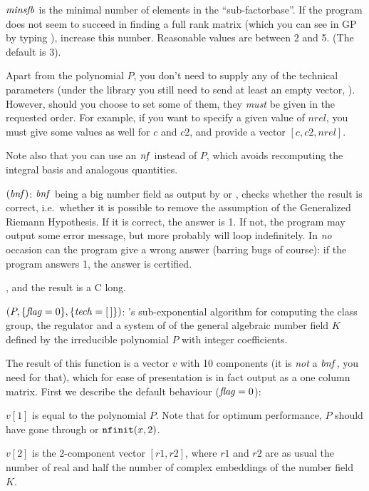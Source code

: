 $\hbox{\it minsfb\/}$ is the minimal number of elements in the ``sub-factorbase''.
If the program does not seem to succeed in finding a full rank matrix (which
you can see in GP by typing ), increase this number. Reasonable
values are between 2 and 5. (The default is 3).


Apart from the polynomial $P$, you don't need to supply any of the technical
parameters (under the library you still need to send at least an empty
vector, ). However, should you choose to set some of
them, they \emph{must} be given in the requested order. For example, if you
want to specify a given value of $nrel$, you must give some values as well
for $c$ and $c2$, and provide a vector $[c,c2,nrel]$.

Note also that you can use an $\hbox{\it nf\/}$ instead of $P$, which avoids
recomputing the integral basis and analogous quantities.

\smallskip
{}$(\hbox{\it bnf\/})$: $\hbox{\it bnf\/}$ being a big number field
as output by  or , checks whether the result
is correct, i.e.~whether it is possible to remove the assumption of the
Generalized Riemann Hypothesis. If it is correct, the answer is 1.
If not, the program may output some error message, but more probably will loop
indefinitely. In \emph{no} occasion can the program give a wrong answer
(barring bugs of course): if the program answers 1, the answer is certified.

, and the result is a C long.

$(P,\{\hbox{\it f\kern0pt lag\/}=0\},\{\hbox{\it tech\/}=[\,]\})$: 's
sub-exponential algorithm for computing the class group, the regulator and a
system of  of the general algebraic number field $K$
defined by the irreducible polynomial $P$ with integer coefficients.

The result of this function is a vector $v$ with 10 components (it is
\emph{not} a $\hbox{\it bnf\/}$, you need  for that), which for ease of
presentation is in fact output as a one column matrix. First we describe the
default behaviour ($\hbox{\it f\kern0pt lag\/}=0$):

 $v[1]$ is equal to the polynomial $P$. Note that for optimum performance,
$P$ should have gone through  or ${\tt nfinit}(x,2)$.

 $v[2]$ is the 2-component vector $[r1,r2]$, where $r1$ and $r2$ are as usual
the number of real and half the number of complex embeddings of the number
field $K$.

